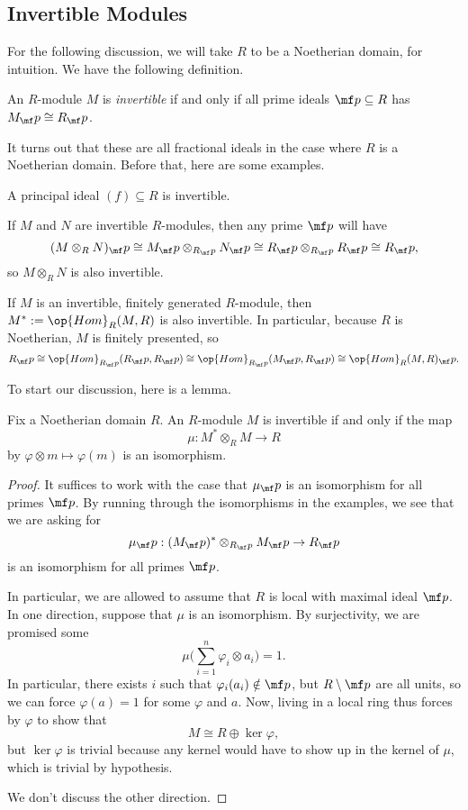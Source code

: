 \documentclass[../notes.tex]{subfiles}
\begin{document}
\subsection{Invertible Modules}
For the following discussion, we will take $R$ to be a Noetherian domain, for intuition. We have the following definition.
\begin{definition}
	An $R$-module $M$ is \textit{invertible} if and only if all prime ideals $\mf p\subseteq R$ has $M_\mf p\cong R_\mf p$.
\end{definition}
It turns out that these are all fractional ideals in the case where $R$ is a Noetherian domain. Before that, here are some examples.
\begin{example}
	A principal ideal $(f)\subseteq R$ is invertible.
\end{example}
\begin{example}
	If $M$ and $N$ are invertible $R$-modules, then any prime $\mf p$ will have
	\[(M\otimes_RN)_\mf p\cong M_\mf p\otimes_{R_\mf p}N_\mf p\cong R_\mf p\otimes_{R_\mf p}R_\mf p\cong R_\mf p,\]
	so $M\otimes_RN$ is also invertible.
\end{example}
\begin{example}
	If $M$ is an invertible, finitely generated $R$-module, then $M^*:=\op{Hom}_R(M,R)$ is also invertible. In particular, because $R$ is Noetherian, $M$ is finitely presented, so
	\[R_\mf p\cong\op{Hom}_{R_\mf p}(R_\mf p,R_\mf p)\cong\op{Hom}_{R_\mf p}(M_\mf p,R_\mf p)\cong\op{Hom}_R(M,R)_\mf p.\]
\end{example}
To start our discussion, here is a lemma.
\begin{lemma}
	Fix a Noetherian domain $R$. An $R$-module $M$ is invertible if and only if the map
	\[\mu:M^*\otimes_RM\to R\]
	by $\varphi\otimes m\mapsto\varphi(m)$ is an isomorphism.
\end{lemma}
\begin{proof}
	It suffices to work with the case that $\mu_\mf p$ is an isomorphism for all primes $\mf p$. By running through the isomorphisms in the examples, we see that we are asking for
	\[\mu_\mf p:(M_\mf p)^*\otimes_{R_\mf p}M_\mf p\to R_\mf p\]
	is an isomorphism for all primes $\mf p$.

	In particular, we are allowed to assume that $R$ is local with maximal ideal $\mf p$. In one direction, suppose that $\mu$ is an isomorphism. By surjectivity, we are promised some
	\[\mu\Bigg(\sum_{i=1}^n\varphi_i\otimes a_i\Bigg)=1.\]
	In particular, there exists $i$ such that $\varphi_i(a_i)\notin\mf p$, but $R\setminus\mf p$ are all units, so we can force $\varphi(a)=1$ for some $\varphi$ and $a$. Now, living in a local ring thus forces by $\varphi$ to show that
	\[M\cong R\oplus\ker\varphi,\]
	but $\ker\varphi$ is trivial because any kernel would have to show up in the kernel of $\mu$, which is trivial by hypothesis.

	We don't discuss the other direction.
\end{proof}
\end{document}
